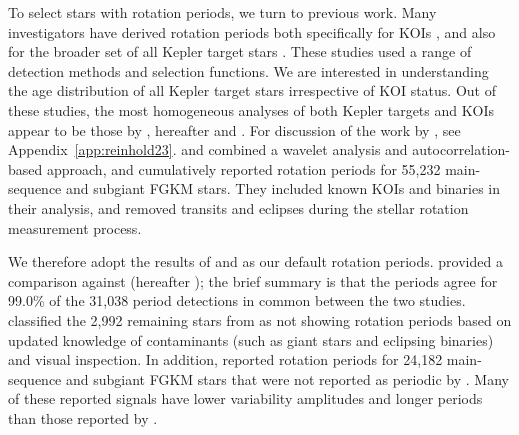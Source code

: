 \documentclass[11pt,twocolumn,tighten]{aastex63}
\begin{document}
To select stars with rotation periods, we turn to previous work.  Many
investigators have derived rotation periods both specifically for KOIs
\citep{McQuillan_2013,Walkowicz_2013,Mazeh_2015,Angus_2018,David_2021},
and also for the broader set of all Kepler target stars
\citep{McQuillan_2014,Reinhold_2015,Santos_2019,Santos_2021,Reinhold2023}.
These studies used a range of detection methods and selection
functions.  We are interested in understanding the age distribution of
all Kepler target stars irrespective of KOI status.  Out of these
studies, the most homogeneous analyses of both Kepler
targets and KOIs appear to be those by
\citet{Santos_2019,Santos_2021}, hereafter 
and .  For discussion of the work by
\citet{Reinhold2023}, see Appendix~\ref{app:reinhold23}.
 and  combined a
wavelet analysis and autocorrelation-based approach, and cumulatively
reported rotation periods for 55{,}232 main-sequence and subgiant FGKM
stars.  They included known KOIs and binaries in their analysis, and
removed transits and eclipses during the stellar rotation measurement
process. 

We therefore adopt the results of  and
 as our default rotation periods.
 provided a comparison against
\citet{McQuillan_2014} (hereafter ); the brief summary is that the periods
agree for 99.0\% of the 31{,}038 period detections in common between
the two studies.   classified the 2{,}992
remaining stars from  as not showing
rotation periods based on updated knowledge of contaminants
(such as giant stars and eclipsing binaries) and visual inspection.  In
addition,  reported rotation periods for
24{,}182 main-sequence and subgiant FGKM stars that were not reported
as periodic by .  Many of these reported
signals have lower variability amplitudes and longer periods than
those reported by . 
\end{document}
